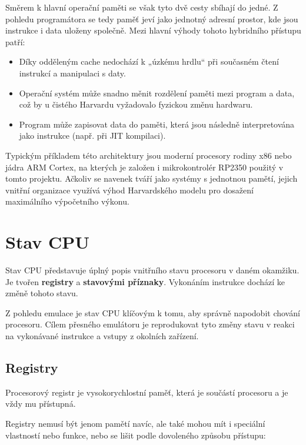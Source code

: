 Směrem k hlavní operační paměti se však tyto dvě cesty sbíhají do jedné. Z pohledu programátora se
tedy paměť jeví jako jednotný adresní prostor, kde jsou instrukce i data uloženy společně. Mezi
hlavní výhody tohoto hybridního přístupu patří:

\begin{itemize}
    \item Díky odděleným cache nedochází k „úzkému hrdlu“ při současném čtení instrukcí a manipulaci
        s daty.
    \item Operační systém může snadno měnit rozdělení paměti mezi program a data, což by u čistého
        Harvardu vyžadovalo fyzickou změnu hardwaru.
    \item Program může zapisovat data do paměti, která jsou následně interpretována jako instrukce
        (např. při JIT kompilaci).
\end{itemize}

Typickým příkladem této architektury jsou moderní procesory rodiny x86 nebo jádra ARM Cortex, na
kterých je založen i mikrokontrolér RP2350 použitý v tomto projektu. Ačkoliv se navenek tváří jako
systémy s jednotnou pamětí, jejich vnitřní organizace využívá výhod Harvardského modelu pro dosažení
maximálního výpočetního výkonu.

\section{Stav CPU}

Stav CPU představuje úplný popis vnitřního stavu procesoru v daném okamžiku. Je tvořen
\textbf{registry}
a \textbf{stavovými příznaky}. Vykonáním instrukce dochází ke změně tohoto stavu.

Z pohledu emulace je stav CPU klíčovým k tomu, aby správně napodobit chování procesoru. Cílem
přesného emulátoru je reprodukovat tyto změny stavu v reakci na vykonávané instrukce a vstupy z
okolních zařízení.

\subsection{Registry}

Procesorový registr je vysokorychlostní paměť, která je součástí procesoru a je vždy mu přístupná.

Registry nemusí být jenom pamětí navíc, ale také mohou mít i speciální vlastností nebo funkce,
nebo se lišit podle dovoleného způsobu přístupu:

